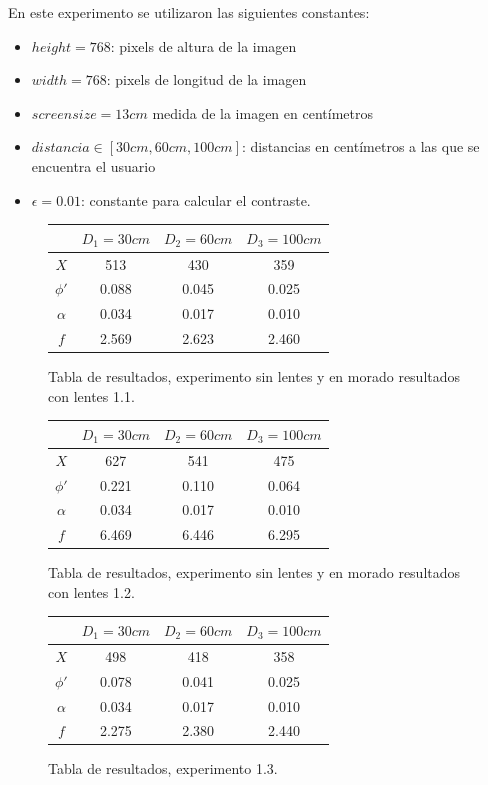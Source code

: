 \documentclass[conference]{IEEEtran}
\begin{document}
En este experimento se utilizaron las siguientes constantes:
\begin{itemize}
\item $height = 768$: pixels de altura de la imagen
\item $width = 768$: pixels de longitud de la imagen
\item $screensize=13cm$ medida de la imagen en centímetros
\item $distancia\in [30cm,60cm,100cm]$: distancias en centímetros a las que se encuentra el usuario
\item $\epsilon=0.01$: constante para calcular el contraste.
\end{itemize}

\begin{figure}[htbp]
\centering

\begin{tabular}{c|c|c|c|}
	 & $D_1=30cm$ & $D_2=60cm$ & $D_3=100 cm$\\
	\hline
	$X$ & 513 & 430 & 359\\
	\hline
	$\phi'$ & 0.088 & 0.045 & 0.025\\
	\hline
	$\alpha$ & 0.034 & 0.017 & 0.010\\
	\hline
	$f$ & 2.569 & 2.623 & 2.460\\
	\hline
\end{tabular}

\caption{Tabla de resultados, experimento sin lentes y en morado resultados con lentes 1.1.}
\label{res1.1}
\end{figure}


\begin{figure}[htbp]
\centering

\begin{tabular}{c|c|c|c|}
	 & $D_1=30cm$ & $D_2=60cm$ & $D_3=100 cm$\\
	\hline
	$X$ & 627 & 541 & 475\\
	\hline
	$\phi'$ & 0.221 & 0.110 & 0.064\\
	\hline
	$\alpha$ & 0.034 & 0.017 & 0.010\\
	\hline
	$f$ & 6.469 & 6.446 & 6.295\\
	\hline
\end{tabular}
\caption{Tabla de resultados, experimento sin lentes y en morado resultados con lentes 1.2.}
\label{res1.2}
\end{figure}

\begin{figure}[htbp]
\centering

\begin{tabular}{c|c|c|c|}
	 & $D_1=30cm$ & $D_2=60cm$ & $D_3=100 cm$\\
	\hline
	$X$ & 498 & 418 & 358\\
	\hline
	$\phi'$ & 0.078 & 0.041 & 0.025\\
	\hline
	$\alpha$ & 0.034 & 0.017 & 0.010\\
	\hline
	$f$ & 2.275 & 2.380 & 2.440\\
	\hline

\end{tabular}

\caption{Tabla de resultados, experimento 1.3.}
\label{res1.3}
\end{figure}
\end{document}
